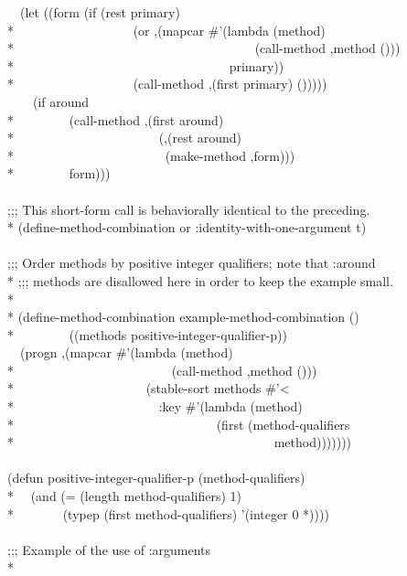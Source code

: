 \begin{defmac}
\begin{lisp}
~~(let ((form (if (rest primary) \\*
~~~~~~~~~~~~~~~~~~{\Xbq}(or ,{\Xatsign}(mapcar \#'(lambda (method) \\*
~~~~~~~~~~~~~~~~~~~~~~~~~~~~~~~~~~~~~{\Xbq}(call-method ,method ())) \\*
~~~~~~~~~~~~~~~~~~~~~~~~~~~~~~~~~primary)) \\*
~~~~~~~~~~~~~~~~~~{\Xbq}(call-method ,(first primary) ())))) \\
~~~~(if around \\*
~~~~~~~~{\Xbq}(call-method ,(first around) \\*
~~~~~~~~~~~~~~~~~~~~~~(,{\Xatsign}(rest around) \\*
~~~~~~~~~~~~~~~~~~~~~~~(make-method ,form))) \\*
~~~~~~~~form))) \\
\\
;;; This short-form call is behaviorally identical to the preceding. \\*
(define-method-combination or :identity-with-one-argument t) \\
 \\
;;; Order methods by positive integer qualifiers; note that :around \\*
;;; methods are disallowed here in order to keep the example small. \\*
\\*
(define-method-combination example-method-combination () \\*
~~~~~~~~((methods positive-integer-qualifier-p)) \\
~~{\Xbq}(progn ,{\Xatsign}(mapcar \#'(lambda (method) \\*
~~~~~~~~~~~~~~~~~~~~~~~~{\Xbq}(call-method ,method ())) \\*
~~~~~~~~~~~~~~~~~~~~(stable-sort methods \#'< \\*
~~~~~~~~~~~~~~~~~~~~~~:key \#'(lambda (method) \\*
~~~~~~~~~~~~~~~~~~~~~~~~~~~~~~~(first (method-qualifiers \\*
~~~~~~~~~~~~~~~~~~~~~~~~~~~~~~~~~~~~~~~~method))))))) \\
\\
(defun positive-integer-qualifier-p (method-qualifiers) \\*
~~(and (= (length method-qualifiers) 1) \\*
~~~~~~~(typep (first method-qualifiers) '(integer 0 *)))) \\
\\
;;; Example of the use of :arguments \\*

\end{lisp}
\end{defmac}
